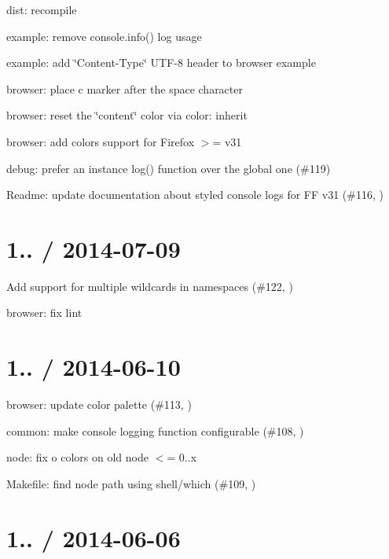 \begin{DoxyItemize}
\item dist\+: recompile
\item example\+: remove {\ttfamily console.\+info()} log usage
\item example\+: add \char`\"{}\+Content-\/\+Type\char`\"{} U\+T\+F-\/8 header to browser example
\item browser\+: place c marker after the space character
\item browser\+: reset the \char`\"{}content\char`\"{} color via {\ttfamily color\+: inherit}
\item browser\+: add colors support for Firefox $>$= v31
\item debug\+: prefer an instance {\ttfamily log()} function over the global one (\#119)
\item Readme\+: update documentation about styled console logs for FF v31 (\#116, )
\end{DoxyItemize}

\section*{1.. / 2014-\/07-\/09 }


\begin{DoxyItemize}
\item Add support for multiple wildcards in namespaces (\#122, )
\item browser\+: fix lint
\end{DoxyItemize}

\section*{1.. / 2014-\/06-\/10 }


\begin{DoxyItemize}
\item browser\+: update color palette (\#113, )
\item common\+: make console logging function configurable (\#108, )
\item node\+: fix o colors on old node $<$= 0..\+x
\item Makefile\+: find node path using shell/which (\#109, )
\end{DoxyItemize}

\section*{1.. / 2014-\/06-\/06 }


